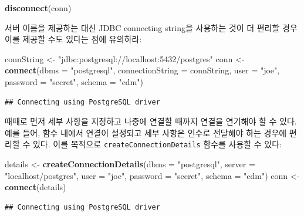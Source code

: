 \documentclass[10.5pt]{book}
\newenvironment{Shaded}{\begin{snugshade}}{\end{snugshade}}
\newcommand{\KeywordTok}[1]{\textcolor[rgb]{0.13,0.29,0.53}{\textbf{#1}}}
\newcommand{\DataTypeTok}[1]{\textcolor[rgb]{0.13,0.29,0.53}{#1}}
\newcommand{\StringTok}[1]{\textcolor[rgb]{0.31,0.60,0.02}{#1}}
\newcommand{\NormalTok}[1]{#1}
\theoremstyle{definition}
\theoremstyle{definition}
\theoremstyle{definition}
\theoremstyle{remark}
\begin{document}
\begin{Shaded}
\begin{Highlighting}[]
\KeywordTok{disconnect}\NormalTok{(conn)}
\end{Highlighting}
\end{Shaded}

서버 이름을 제공하는 대신 JDBC connecting string을 사용하는 것이 더
편리할 경우 이를 제공할 수도 있다는 점에 유의하라:

\begin{Shaded}
\begin{Highlighting}[]
\NormalTok{connString <-}\StringTok{ "jdbc:postgresql://localhost:5432/postgres"}
\NormalTok{conn <-}\StringTok{ }\KeywordTok{connect}\NormalTok{(}\DataTypeTok{dbms =} \StringTok{"postgresql"}\NormalTok{,}
                \DataTypeTok{connectionString =}\NormalTok{ connString,}
                \DataTypeTok{user =} \StringTok{"joe"}\NormalTok{,}
                \DataTypeTok{password =} \StringTok{"secret"}\NormalTok{,}
                \DataTypeTok{schema =} \StringTok{"cdm"}\NormalTok{)}
\end{Highlighting}
\end{Shaded}

\begin{verbatim}
## Connecting using PostgreSQL driver
\end{verbatim}

때때로 먼저 세부 사항을 지정하고 나중에 연결할 때까지 연결을 연기해야 할
수 있다. 예를 들어, 함수 내에서 연결이 설정되고 세부 사항은 인수로
전달해야 하는 경우에 편리할 수 있다. 이를 목적으로
\texttt{createConnectionDetails} 함수를 사용할 수 있다:

\begin{Shaded}
\begin{Highlighting}[]
\NormalTok{details <-}\StringTok{ }\KeywordTok{createConnectionDetails}\NormalTok{(}\DataTypeTok{dbms =} \StringTok{"postgresql"}\NormalTok{,}
                                   \DataTypeTok{server =} \StringTok{"localhost/postgres"}\NormalTok{,}
                                   \DataTypeTok{user =} \StringTok{"joe"}\NormalTok{,}
                                   \DataTypeTok{password =} \StringTok{"secret"}\NormalTok{,}
                                   \DataTypeTok{schema =} \StringTok{"cdm"}\NormalTok{)}
\NormalTok{conn <-}\StringTok{ }\KeywordTok{connect}\NormalTok{(details)}
\end{Highlighting}
\end{Shaded}

\begin{verbatim}
## Connecting using PostgreSQL driver
\end{verbatim}
\end{document}
